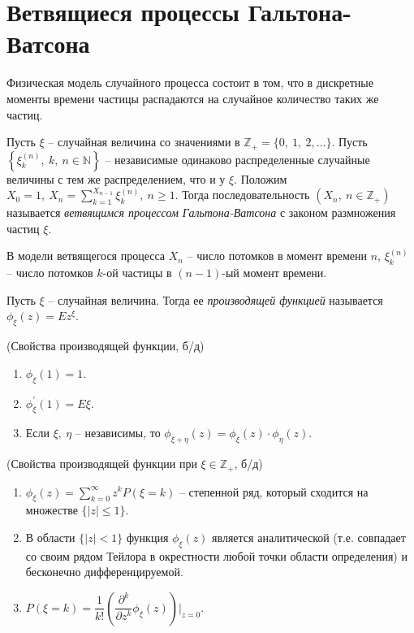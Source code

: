 \section{Ветвящиеся процессы Гальтона-Ватсона}
\begin{note}
Физическая модель случайного процесса состоит в том, что в дискретные моменты времени частицы распадаются на случайное количество таких же частиц.
\end{note}
\begin{definition}
Пусть $\displaystyle \xi $ -- случайная величина со значениями в $\displaystyle \mathbb{Z}_{+} =\{0,\ 1,\ 2,\dotsc \}$. Пусть $\displaystyle \left\{\xi _{k}^{( n)} ,\ k,\ n\in \mathbb{N}\right\}$ -- независимые одинаково распределенные случайные величины с тем же распределением, что и у $\displaystyle \xi $. Положим $\displaystyle X_{0} =1,\ X_{n} =\sum _{k=1}^{X_{n-1}} \xi _{k}^{( n)} ,\ n\geqslant 1$. Тогда последовательность $\displaystyle ( X_{n} ,\ n\in \mathbb{Z}_{+})$ называется \textit{ветвящимся процессом Гальтона-Ватсона} с законом размножения частиц $\displaystyle \xi $.
\end{definition}
\begin{note}
В модели ветвящегося процесса $\displaystyle X_{n}$ -- число потомков в момент времени $\displaystyle n$, $\displaystyle \xi _{k}^{( n)}$ -- число потомков $\displaystyle k$-ой частицы в $\displaystyle ( n-1)$-ый момент времени.
\end{note}
\begin{definition}
Пусть $\displaystyle \xi $ -- случайная величина. Тогда ее \textit{производящей функцией} называется $\displaystyle \phi _{\xi }( z) =Ez^{\xi }$.
\end{definition}
\begin{proposition}
(Свойства производящей функции, б/д)
\begin{enumerate}
    \item $\displaystyle \phi _{\xi }( 1) =1$.
    \item $\displaystyle \phi _{\xi }^{'}( 1) =E\xi$.
    \item Если $\displaystyle \xi ,\ \eta $ -- независимы, то $\displaystyle \phi _{\xi +\eta }( z) =\phi _{\xi }( z) \cdotp \phi _{\eta }( z)$.
\end{enumerate}
\end{proposition}
\begin{proposition}
(Свойства производящей функции при $\displaystyle \xi \in \mathbb{Z}_{+}$, б/д)
\begin{enumerate}
    \item $\displaystyle \phi _{\xi }( z) =\sum _{k=0}^{\infty } z^{k} P( \xi =k)$ -- степенной ряд, который сходится на множестве $\displaystyle \{| z| \leqslant 1\}$.
    \item В области $\displaystyle \{| z| < 1\}$ функция $\displaystyle \phi _{\xi }( z)$ является аналитической (т.е. совпадает со своим рядом Тейлора в окрестности любой точки области определения) и бесконечно дифференцируемой.
    \item $\displaystyle P( \xi =k) =\dfrac{1}{k!}\left(\dfrac{\partial ^{k}}{\partial z^{k}} \phi _{\xi }( z)\right) \biggr\rvert_{z=0}.$
\end{enumerate}
\end{proposition}
